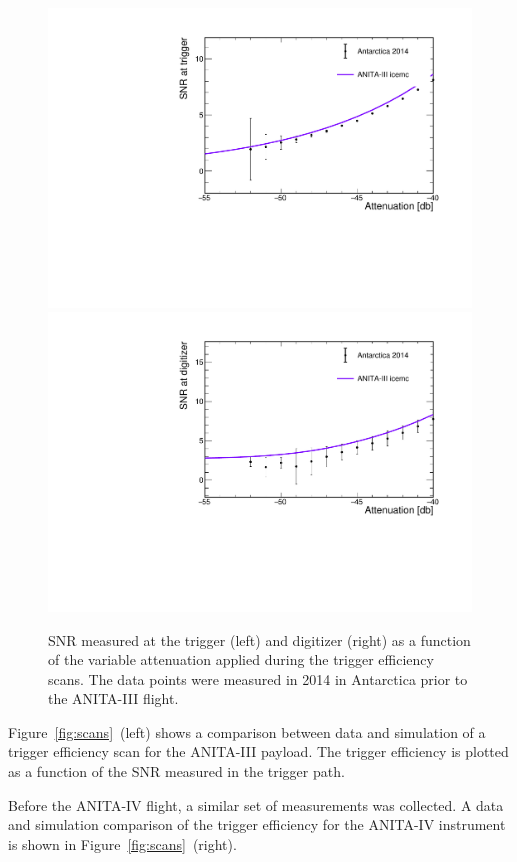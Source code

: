 \begin{figure}[!h]\centering
  \includegraphics[width=.45\linewidth]{./Figs/EfficiencyScanNoDelaysA3_snrTriggerVSattenuation.pdf} 
  \includegraphics[width=.45\linewidth]{./Figs/EfficiencyScanNoDelaysA3_snrDigitizerVSattenuation.pdf}
  \caption{SNR measured at the trigger (left) and digitizer (right) as
  a function of the variable attenuation applied during the trigger
  efficiency scans. The data points were measured in 2014 in Antarctica prior to the
  ANITA-III flight.
}
  \label{fig:scan_snr}
\end{figure}

Figure~\ref{fig:scans}~(left) shows a comparison between data and simulation of a trigger efficiency scan for the ANITA-III payload.
The trigger efficiency is plotted as a function of the SNR
measured in the trigger path.

Before the ANITA-IV flight, a similar set of measurements was collected.
A data and simulation comparison of the trigger efficiency for the ANITA-IV instrument is shown in Figure~\ref{fig:scans}~(right).


